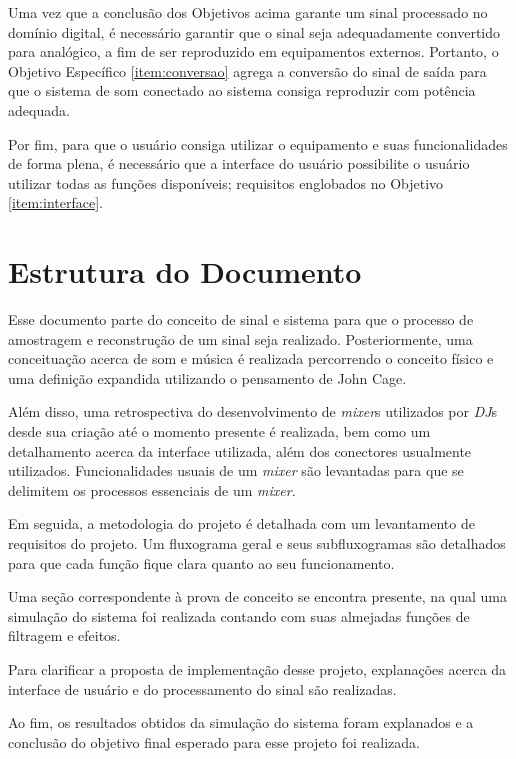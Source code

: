 Uma vez que a conclusão dos Objetivos acima garante um sinal processado no domínio digital, é necessário garantir que o sinal seja adequadamente convertido para analógico, a fim de ser reproduzido em equipamentos externos. Portanto, o Objetivo Específico \ref{item:conversao} agrega a conversão do sinal de saída para que o sistema de som conectado ao sistema consiga reproduzir com potência adequada. 

Por fim, para que o usuário consiga utilizar o equipamento e suas funcionalidades de forma plena, é necessário que a interface do usuário possibilite o usuário utilizar todas as funções disponíveis; requisitos englobados no Objetivo \ref{item:interface}.

\section{Estrutura do Documento}

Esse documento parte do conceito de sinal e sistema para que o processo de amostragem e reconstrução de um sinal seja realizado. Posteriormente, uma conceituação acerca de som e música é realizada percorrendo o conceito físico e uma definição expandida utilizando o pensamento de John Cage.

Além disso, uma retrospectiva do desenvolvimento de \textit{mixer}s utilizados por \textit{DJ}s desde sua criação até o momento presente é realizada, bem como um detalhamento acerca da interface utilizada, além dos conectores usualmente utilizados. Funcionalidades usuais de um \textit{mixer} são levantadas para que se delimitem os processos essenciais de um \textit{mixer}.

Em seguida, a metodologia do projeto é detalhada com um levantamento de requisitos do projeto. Um fluxograma geral e seus subfluxogramas são detalhados para que cada função fique clara quanto ao seu funcionamento.

Uma seção correspondente à prova de conceito se encontra presente, na qual uma simulação do sistema foi realizada contando com suas almejadas funções de filtragem e efeitos.

Para clarificar a proposta de implementação desse projeto, explanações acerca da interface de usuário e do processamento do sinal são realizadas.

Ao fim, os resultados obtidos da simulação do sistema foram explanados e a conclusão do objetivo final esperado para esse projeto foi realizada.